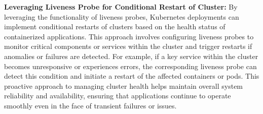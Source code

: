 \textbf{Leveraging Liveness Probe for Conditional Restart of Cluster:}
By leveraging the functionality of liveness probes, Kubernetes deployments can implement conditional restarts of clusters based on the health status of containerized applications. This approach involves configuring liveness probes to monitor critical components or services within the cluster and trigger restarts if anomalies or failures are detected. For example, if a key service within the cluster becomes unresponsive or experiences errors, the corresponding liveness probe can detect this condition and initiate a restart of the affected containers or pods. This proactive approach to managing cluster health helps maintain overall system reliability and availability, ensuring that applications continue to operate smoothly even in the face of transient failures or issues.
